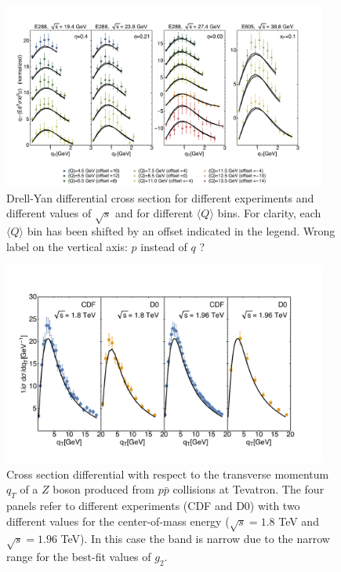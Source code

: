 \documentclass[aps,preprintnumbers,showpacs,nofootinbib,superscriptaddress,floatfix]{revtex4}
\newcommand{\AS}[1]{{\textcolor[rgb]{1,0,1}{#1}}}
\begin{document}
\begin{figure}[h!]
\centering
\includegraphics[width=0.95\textwidth]{plots/DY_SCIplot_flINDEP.pdf}
\caption{Drell-Yan differential cross section for different experiments and different values of $\sqrt{s}$ and for different $\langle Q \rangle$ bins. For clarity, each $\langle Q \rangle$  bin has been shifted by an offset indicated in the legend. \AS{Wrong label on the vertical axis: $p$ instead of $q$ ?}}
\label{f:DY_panel}
\end{figure}
\begin{figure}[h!]
\begin{center}
\includegraphics[width=0.95\textwidth]{plots/Z_SCIplot_flINDEP.pdf}
\end{center}
\caption{Cross section differential with respect to the transverse momentum $q_T$ of a $Z$ boson produced from $p\bar{p}$ collisions at Tevatron. The four panels refer to different experiments (CDF and D$0$) with two different values for the center-of-mass energy ($\sqrt{s} = 1.8$ TeV and $\sqrt{s}=1.96$ TeV). In this case the band is narrow due to the narrow range for the best-fit values of $g_2$.} 
\label{f:Z_qT}
\end{figure}
\end{document}
